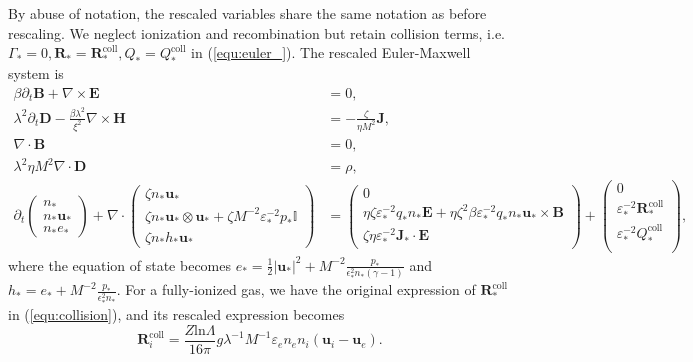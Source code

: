\documentclass{article}
\begin{document}
By abuse of notation, the rescaled variables share the same notation as before rescaling. We neglect ionization and recombination but retain collision terms, i.e. $\Gamma_* = 0, \mathbf{R}_* = \mathbf{R}_*^\text{coll}, Q_* = Q_*^\text{coll}$ in (\ref{equ:euler_}). The rescaled Euler-Maxwell system is
\begin{subequations}
\begin{align}
    \beta \partial_t \mathbf{B} + \nabla \times \mathbf{E} &= 0, \label{equ:maxwell_faraday_rescalling} \\ 
    \lambda^2 \partial_t \mathbf{D} - \frac{\beta \lambda^2}{\xi^2}\nabla \times \mathbf{H} &= - \frac{\zeta}{\eta M^2}\mathbf{J}, \label{equ:maxwell_ampere_rescalling} \\
    \nabla \cdot \mathbf{B} &= 0,  \label{equ:maxwell_gauss_B_rescalling}\\
    \lambda^2 \eta M^2 \nabla \cdot \mathbf{D} &= \rho, \label{equ:maxwell_gauss_D_rescalling} \\
    \partial_t
    \begin{pmatrix}
    n_* \\
    n_* \mathbf{u}_* \\
    n_* e_*
    \end{pmatrix}
    + \nabla \cdot
    \begin{pmatrix}
    \zeta n_* \mathbf{u}_* \\
    \zeta n_* \mathbf{u}_* \otimes \mathbf{u}_* + \zeta M^{-2} \varepsilon_*^{-2} p_*\mathbb{I} \\
    \zeta n_* h_* \mathbf{u}_*
    \end{pmatrix}
    &=
    \begin{pmatrix}
    0 \\
    \eta \zeta \varepsilon_*^{-2} q_* n_*\mathbf{E} + \eta \zeta^2 \beta \varepsilon_*^{-2} q_* n_* \mathbf{u}_* \times \mathbf{B} \\
    \zeta \eta \varepsilon_*^{-2} \mathbf{J}_* \cdot \mathbf{E}
    \end{pmatrix} +
    \begin{pmatrix}
    0 \\
    \varepsilon_*^{-2}\mathbf{R}_*^{\text{coll}} \\
    \varepsilon_*^{-2}Q_*^{\text{coll}} \\
    \end{pmatrix}, \label{equ:euler_rescalling}
\end{align}
\end{subequations}
where the equation of state becomes $e_* = \frac{1}{2}|\mathbf{u_*}|^2 + M^{-2}\frac{p_*}{\epsilon^2_* n_* (\gamma - 1)}$ and $h_* = e_* + M^{-2}\frac{p_*}{\epsilon^2_* n_*}$. For a fully-ionized gas, we have the original expression of $\mathbf{R}_*^{\text{coll}}$ in (\ref{equ:collision}), and its rescaled expression becomes
\begin{equation}
    \mathbf{R}_i^{\text{coll}} = \frac{Z\text{ln}\Lambda}{16\pi}g\lambda^{-1}M^{-1}\varepsilon_en_en_i(\mathbf{u}_i - \mathbf{u}_e). \label{equ:rescaling_friction}
\end{equation}
\end{document}
